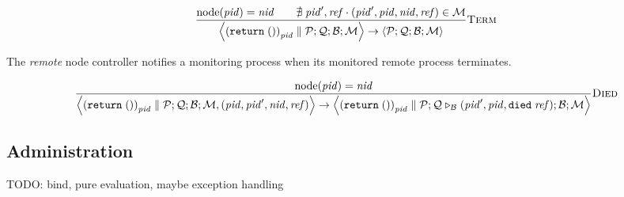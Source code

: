 \documentclass{article}
\newcommand{\sReturn}{\mathtt{return}}
\DeclareMathOperator{\sNodeOf}{node}
\newcommand{\sExtend}[1]{\mathrel{\triangleright_{#1}}}
\newcommand{\sPar}{\mathrel{\parallel}}
\newcommand{\sNid}{\ensuremath{\mathit{nid}}}
\newcommand{\sPid}{\ensuremath{\mathit{pid}}}
\newcommand{\sRef}{\ensuremath{\mathit{ref}}}
\newcommand{\sSystem}[4]{\left\langle #1 ; #2 ; #3 ; #4 \right\rangle}
\newcommand{\sQueue}{\mathcal{Q}}
\newcommand{\sProcesses}{\mathcal{P}}
\newcommand{\sBlacklist}{\mathcal{B}}
\newcommand{\sMonitors}{\mathcal{M}}
\begin{document}
\begin{equation*}
\frac{
  \sNodeOf(\sPid) = \sNid
\qquad
  \nexists \; \sPid', \sRef \cdot (\sPid', \sPid, \sNid, \sRef) \in \sMonitors 
}{
  \sSystem{{(\sReturn \; ())}_\sPid \sPar \sProcesses}
          {\sQueue}
          {\sBlacklist}
          {\sMonitors}
\rightarrow          
  \sSystem{\sProcesses}
          {\sQueue}
          {\sBlacklist}
          {\sMonitors}
} \textsc{Term}
\end{equation*}

The \emph{remote} node controller notifies a monitoring process when its
monitored remote process terminates.

\begin{equation*}
\frac{
  \sNodeOf(\sPid) = \sNid
}{
  \sSystem{{(\sReturn \; ())}_\sPid \sPar \sProcesses}
          {\sQueue}
          {\sBlacklist}
          {\sMonitors, (\sPid, \sPid', \sNid, \sRef)}
\rightarrow
  \sSystem{{(\sReturn \; ())}_\sPid \sPar \sProcesses}
          {\sQueue \sExtend{\sBlacklist} (\sPid', \sPid, \mathtt{died} \; \sRef)}
          {\sBlacklist}
          {\sMonitors}
} \textsc{Died}
\end{equation*}

\subsection{Administration}

TODO: bind, pure evaluation, maybe exception handling
\end{document}
